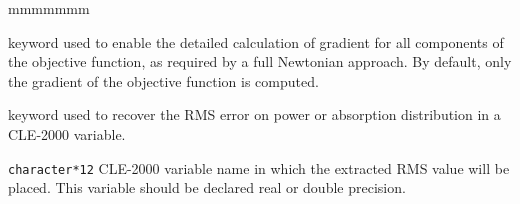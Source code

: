 \begin{ListeDeDescription}{mmmmmmm}
\item[\moc{NEWTON}] keyword used to enable the detailed calculation of gradient for all components of the objective function, as required by a
full Newtonian approach. By default, only the gradient of the objective function is computed.

\item[\moc{RMS}] keyword used to recover the RMS error on power or absorption distribution in a CLE-2000 variable.

\item[\dusa{RMS\_VAL}] {\tt character*12} CLE-2000 variable name in which the extracted RMS value will be placed. This variable should be
declared real or double precision.

\end{ListeDeDescription}

\eject
